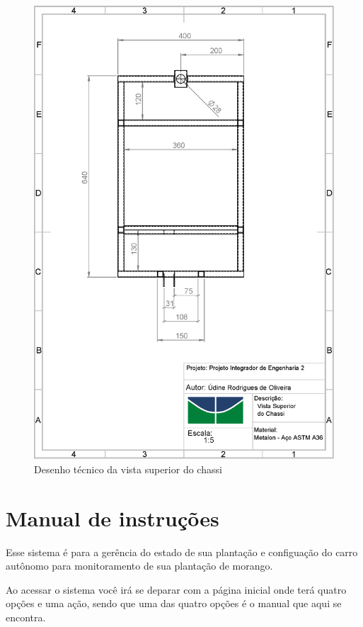 \begin{apendicesenv}
\begin{figure}[!htbp]
	\centering
	\includegraphics[width=\textwidth]{figuras/chassi_superior.eps}
	\caption{Desenho técnico da vista superior do chassi}
\end{figure}

\chapter{Manual de instruções}
\label{manuel}

Esse sistema é para a gerência do estado de sua plantação e configuação do carro autônomo para monitoramento de sua plantação de morango.

Ao acessar o sistema você irá se deparar com a página inicial onde terá quatro opções e uma ação, sendo que uma das quatro opções é o
manual que aqui se encontra.


\end{apendicesenv}
